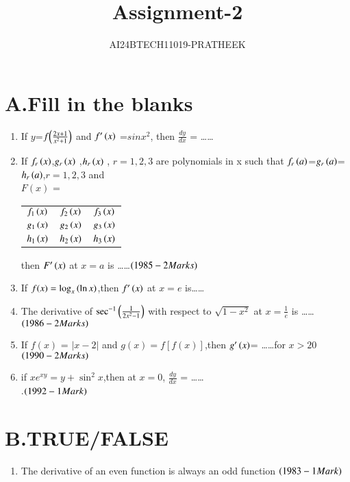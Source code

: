 \documentclass[journal,12pt,onecolumn]{IEEEtran}
\theoremstyle{remark}
\begin{document}

\vspace{3cm}

\title{Assignment-2}
\author{AI24BTECH11019-PRATHEEK}
\maketitle

\bigskip

\renewcommand{\thefigure}{\theenumi}
\renewcommand{\thetable}{\theenumi}

\section*{A.Fill in the blanks}
\begin{enumerate}
    \item If $y$=$f{\left(\frac{2x+1}{x^2+1}\right)}$ and $f'\left(x\right)$ =$sin{x}^2$, then $\frac{dy}{dx}$ = \dots\dots\hfill {} 
    \item If $f_r\left(x\right)$,$g_r\left(x\right)$ ,$h_r\left(x\right)$ , $r=1,2,3$ are polynomials in x such that  $f_r\left(a\right)$=$g_r\left(a\right)$=$h_r\left(a\right)$,$r=1,2,3$ and \\$F(x)$ = 
    \begin{tabular}{|lll|}
         $f_1\left(x\right)$ & $f_2\left(x\right)$ & $f_3\left(x\right)$ \\
         $g_1\left(x\right)$ & $g_2\left(x\right)$ & $g_3\left(x\right)$ \\
         $h_1\left(x\right)$ & $h_2\left(x\right)$ & $h_3\left(x\right)$ \\
          
    \end{tabular} 
    then $F'\left(x\right)$ at $x=a$ is \dots\dots $\hfill\brak{1985 -2Marks}$
\item If $f(x)=\log_{x}\left(\ln{x}\right)$,then $f'\left(x\right)$ at $x=e$ is\dots\dots \hfill {} 
\item The derivative of $\sec^{-1}{\left(\frac{1}{2x^2-1}\right)}$ with respect to $\sqrt{1-x^2}$
at $x=\frac{1}{e}$ is \dots\dots $\hfill\brak{1986 -2Marks}$
\item If $f(x)$ = $|x-2|$ and $g(x)=f[f(x)]$,then $g'\left(x\right)$= \dots\dots for $x>20$ $\hfill\brak{1990-2 Marks}$  
\item if $xe^{xy}=y+\sin^2{x}$,then at $x=0$, $\frac{dy}{dx}$ = \dots\dots\\.$\hfill \brak{1992-1Mark}$
\end{enumerate}
\section*{B.TRUE/FALSE}
\begin{enumerate}
    \item The derivative of an even function is always an odd function $\hfill\brak{1983-1 Mark}$
\end{enumerate}
\end{document}
